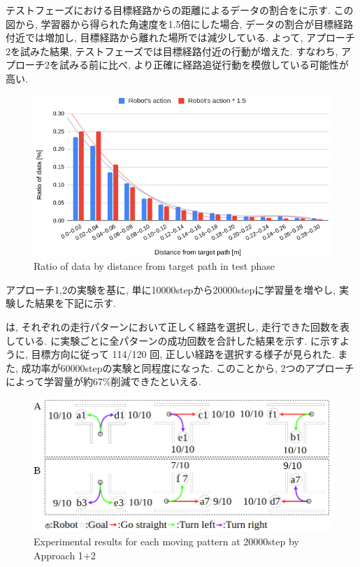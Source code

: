 
  テストフェーズにおける目標経路からの距離によるデータの割合をに示す. この図から, 学習器から得られた角速度を1.5倍にした場合, データの割合が目標経路付近では増加し, 目標経路から離れた場所では減少している. よって, アプローチ2を試みた結果, テストフェーズでは目標経路付近の行動が増えた. すなわち, アプローチ2を試みる前に比べ, より正確に経路追従行動を模倣している可能性が高い.

  \begin{figure}[hbtp]
    \centering
   \includegraphics[keepaspectratio, scale=0.37]
        {images/hist_act_test2.png}
   \caption{Ratio of data by distance from target path in test phase}
   \label{Fig:hist_act_test}
  \end{figure}  



アプローチ1,2の実験を基に, 単に10000stepから20000stepに学習量を増やし, 実験した結果を下記に示す.

は, それぞれの走行パターンにおいて正しく経路を選択し, 走行できた回数を表している.  に実験ごとに全パターンの成功回数を合計した結果を示す.  に示すように, 目標方向に従って 114/120 回, 正しい経路を選択する様子が見られた. また, 成功率が60000stepの実験と同程度になった. このことから, 2つのアプローチによって学習量が約67\%削減できたといえる.

\begin{figure}[hbtp]
  \centering
 \includegraphics[keepaspectratio, scale=0.42]
      {images/20000step_act1.5.png}
 \caption{Experimental results for each moving pattern at 20000step by Approach 1+2}
 \label{Fig:20000step_act1.5}
\end{figure} 

